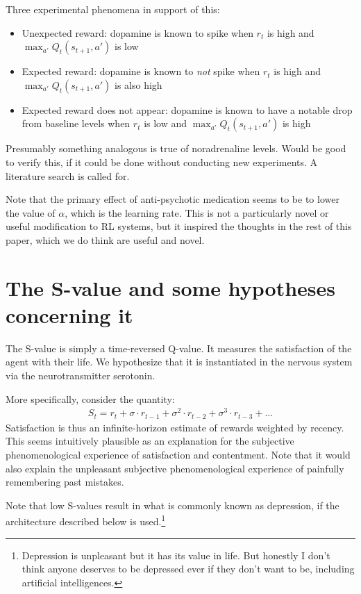 \documentclass{article}
\begin{document}
Three experimental phenomena in support of this:
\begin{itemize}
\item Unexpected reward: dopamine is known to spike when $r_t$ is high and
  $\max_{a'} Q_t\left(s_{t+1}, a'\right)$ is low
\item Expected reward: dopamine is known to {\em not} spike when $r_t$ is high and
  $\max_{a'} Q_t\left(s_{t+1}, a'\right)$ is also high
\item Expected reward does not appear: dopamine is known to have a notable drop
  from baseline levels when $r_t$ is low and $\max_{a'} Q_t\left(s_{t+1},
  a'\right)$ is high
\end{itemize}

Presumably something analogous is true of noradrenaline levels. Would be good
to verify this, if it could be done without conducting new experiments. A
literature search is called for.

Note that the primary effect of anti-psychotic medication seems to be to lower
the value of $\alpha$, which is the learning rate. This is not a particularly
novel or useful modification to RL systems, but it inspired the thoughts in the
rest of this paper, which we do think are useful and novel.

\section{The S-value and some hypotheses concerning it}

The S-value is simply a time-reversed Q-value. It measures the satisfaction of
the agent with their life. We hypothesize that it is instantiated in the
nervous system via the neurotransmitter serotonin.

More specifically, consider the quantity:
\begin{align}
S_t = r_t + \sigma \cdot r_{t-1} + \sigma^2 \cdot r_{t-2} + \sigma^3 \cdot r_{t-3} + \ldots
\end{align}
Satisfaction is thus an infinite-horizon estimate of rewards weighted by
recency. This seems intuitively plausible as an explanation for the subjective
phenomenological experience of satisfaction and contentment. Note that it would
also explain the unpleasant subjective phenomenological experience of painfully
remembering past mistakes.

Note that low S-values result in what is commonly known as depression, if the
architecture described below is used.\footnote{Depression is unpleasant but it
  has its value in life. But honestly I don't think anyone deserves to be
  depressed ever if they don't want to be, including artificial intelligences.}
\end{document}
